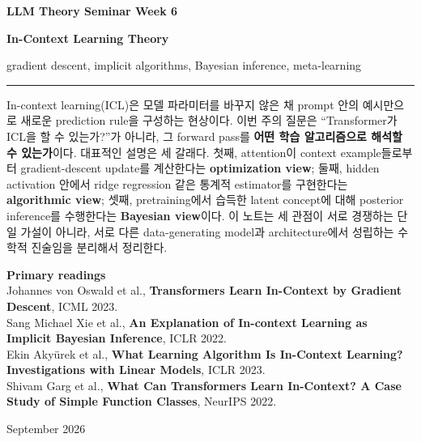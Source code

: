\documentclass[11pt,a4paper,oneside,openany]{memoir}
\theoremstyle{definition}
\begin{document}
\begin{titlingpage}
\thispagestyle{empty}
\vspace*{1.2cm}
{\small\bfseries LLM Theory Seminar \hfill Week 6\par}
\vspace{1.4cm}
{\HUGE\bfseries In-Context Learning Theory\par}
\vspace{0.55cm}
{\large gradient descent, implicit algorithms, Bayesian inference, meta-learning\par}
\vspace{0.9cm}
\rule{\textwidth}{0.7pt}
\vspace{1.1cm}

\begin{minipage}{0.86\textwidth}
\small
In-context learning(ICL)은 모델 파라미터를 바꾸지 않은 채 prompt 안의 예시만으로 새로운 prediction rule을 구성하는 현상이다.
이번 주의 질문은 ``Transformer가 ICL을 할 수 있는가?''가 아니라, 그 forward pass를 \textbf{어떤 학습 알고리즘으로 해석할 수 있는가}이다.
대표적인 설명은 세 갈래다. 첫째, attention이 context example들로부터 gradient-descent update를 계산한다는 \textbf{optimization view};
둘째, hidden activation 안에서 ridge regression 같은 통계적 estimator를 구현한다는 \textbf{algorithmic view};
셋째, pretraining에서 습득한 latent concept에 대해 posterior inference를 수행한다는 \textbf{Bayesian view}이다.
이 노트는 세 관점이 서로 경쟁하는 단일 가설이 아니라, 서로 다른 data-generating model과 architecture에서 성립하는 수학적 진술임을 분리해서 정리한다.
\end{minipage}

\vfill
{\small
\textbf{Primary readings}\\[0.25em]
Johannes von Oswald et al.,
\textbf{Transformers Learn In-Context by Gradient Descent}, ICML 2023.\\
Sang Michael Xie et al.,
\textbf{An Explanation of In-context Learning as Implicit Bayesian Inference}, ICLR 2022.\\
Ekin Akyürek et al.,
\textbf{What Learning Algorithm Is In-Context Learning? Investigations with Linear Models}, ICLR 2023.\\
Shivam Garg et al.,
\textbf{What Can Transformers Learn In-Context? A Case Study of Simple Function Classes}, NeurIPS 2022.
\par}
\vspace{0.8cm}
{\small September 2026\par}
\end{titlingpage}
\end{document}
